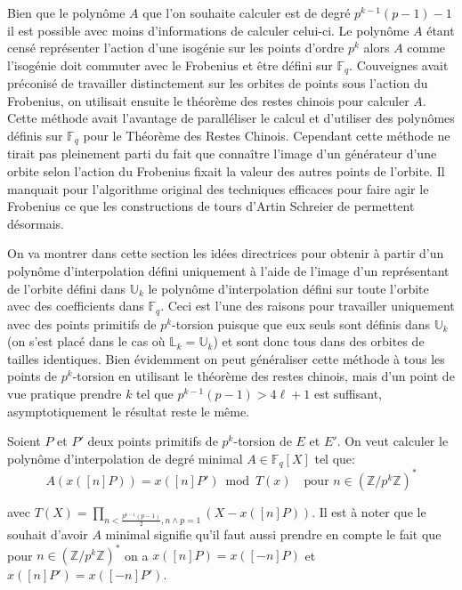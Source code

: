 \documentclass[10pt,a4paper]{book}
\theoremstyle{plain}
\theoremstyle{definition}
\theoremstyle{definition}
\theoremstyle{definition}
\theoremstyle{definition}
\theoremstyle{remark}
\theoremstyle{remark}
\theoremstyle{definition}
\begin{document}
Bien que le polynôme $A$ que l'on souhaite calculer est de degré $p^{k-1}(p-1)-1$ il est possible avec moins d'informations de calculer celui-ci. Le polynôme $A$ étant censé représenter l'action d'une isogénie sur les points d'ordre $p^k$ alors $A$ comme l'isogénie doit commuter avec le Frobenius et être défini sur $\mathbb{F}_q$. Couveignes \cite{Couveignes96} avait préconisé de travailler distinctement sur les orbites de points sous l'action du Frobenius, on utilisait ensuite le théorème des restes chinois pour calculer $A$. Cette méthode avait l'avantage de paralléliser le calcul et d'utiliser des polynômes définis sur $\mathbb{F}_q$ pour le Théorème des Restes Chinois. Cependant cette méthode ne tirait pas pleinement parti du fait que connaître l'image d'un générateur d'une orbite selon l'action du Frobenius fixait la valeur des autres points de l'orbite. Il manquait pour l'algorithme original des techniques efficaces pour faire agir le Frobenius ce que les constructions de tours d'Artin Schreier de \cite{DeFeo-Shost'12} permettent désormais.

On va montrer dans cette section les idées directrices pour obtenir à partir d'un polynôme d'interpolation défini uniquement à l'aide de l'image d'un représentant de l'orbite défini dans $\mathbb{U}_k$ le polynôme d'interpolation défini sur toute l'orbite avec des coefficients dans $\mathbb{F}_q$. Ceci est l'une des raisons pour travailler uniquement avec des points primitifs de $p^k$-torsion puisque que eux seuls sont définis dans $\mathbb{U}_k$ (on s'est placé dans le cas où $\mathbb{L}_k = \mathbb{U}_k$) et sont donc tous dans des orbites de tailles identiques. Bien évidemment on peut généraliser cette méthode à tous les points de $p^k$-torsion en utilisant le théorème des restes chinois, mais d'un point de vue pratique prendre $k$ tel que $p^{k-1}(p-1) > 4 \ell +1$ est suffisant, asymptotiquement le résultat reste le même.

Soient $P$ et $P'$ deux points primitifs de $p^k$-torsion de $E$ et $E'$. On veut calculer le polynôme d'interpolation de degré minimal $A \in \mathbb{F}_q[X]$ tel que:
\begin{equation}
A(x([n]P))=x([n]P') \bmod T(x) \quad \text{pour } n \in \left( \mathbb{Z}/p^k\mathbb{Z} \right)^*
\end{equation} 

avec $T(X)= \prod_{n < \frac{p^{k-1}(p-1)}{2}, n \wedge p =1} (X-x([n]P))$. Il est à noter que le souhait d'avoir $A$ minimal signifie qu'il faut aussi prendre en compte le fait que pour $n \in \left( \mathbb{Z}/p^k \mathbb{Z} \right)^*$ on a $x([n]P)=x([-n]P)$ et $x([n]P')=x([-n]P')$. 
\end{document}

